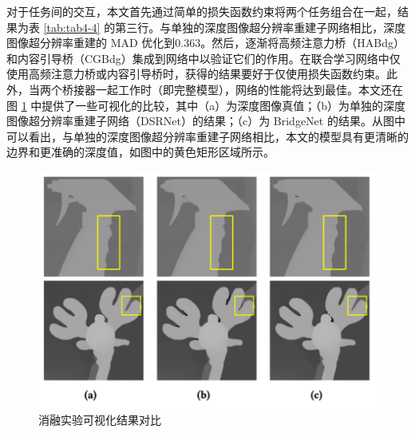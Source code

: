 对于任务间的交互，本文首先通过简单的损失函数约束将两个任务组合在一起，结果为表 \ref{tab:tab4-4} 的第三行。与单独的深度图像超分辨率重建子网络相比，深度图像超分辨率重建的 MAD 优化到0.363。然后，逐渐将高频注意力桥（HABdg）和内容引导桥（CGBdg）集成到网络中以验证它们的作用。在联合学习网络中仅使用高频注意力桥或内容引导桥时，获得的结果要好于仅使用损失函数约束。此外，当两个桥接器一起工作时（即完整模型），网络的性能将达到最佳。本文还在图 \ref{fig:fig4-5} 中提供了一些可视化的比较，其中（a）为深度图像真值；（b）为单独的深度图像超分辨率重建子网络（DSRNet）的结果；（c）为 BridgeNet 的结果。从图中可以看出，与单独的深度图像超分辨率重建子网络相比，本文的模型具有更清晰的边界和更准确的深度值，如图中的黄色矩形区域所示。

\begin{table}[!htbp]
\renewcommand\arraystretch{1}
\caption{针对 BridgeNet 的消融研究量化对比}
\centering
\label{tab:tab4-4}
\end{table}

\begin{figure}[!htbp]
	\centering
	\includegraphics{figures/31.png}
	\caption{消融实验可视化结果对比}
	\label{fig:fig4-5}
	\end{figure}

